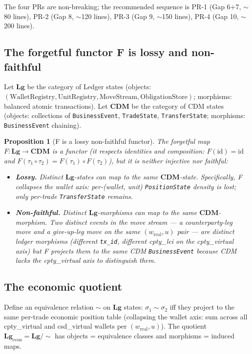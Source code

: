 \documentclass[11pt,a4paper]{article}
\newtheorem{proposition}[definition]{Proposition}
\begin{document}
The four PRs are non-breaking; the recommended sequence is PR-1 (Gap 6+7, $\sim$80 lines), PR-2 (Gap 8, $\sim$120 lines), PR-3 (Gap 9, $\sim$150 lines), PR-4 (Gap 10, $\sim$200 lines).

\subsection{The forgetful functor F is lossy and non-faithful}
\label{sec:cdm-functor}

Let $\mathbf{Lg}$ be the category of Ledger states (objects: $(\mathrm{WalletRegistry}, \mathrm{UnitRegistry}, \mathrm{MoveStream}, \mathrm{ObligationStore})$; morphisms: balanced atomic transactions). Let $\mathbf{CDM}$ be the category of CDM states (objects: collections of \texttt{BusinessEvent}, \texttt{TradeState}, \texttt{TransferState}; morphisms: \texttt{BusinessEvent} chaining).

\begin{proposition}[F is a lossy non-faithful functor]
\label{prop:functor}
The forgetful map $F : \mathbf{Lg} \to \mathbf{CDM}$ is a functor (it respects identities and composition: $F(\mathrm{id}) = \mathrm{id}$ and $F(\tau_1 \circ \tau_2) = F(\tau_1) \circ F(\tau_2)$), but it is neither injective nor faithful:
\begin{itemize}[nosep]
\item \textbf{Lossy.} Distinct $\mathbf{Lg}$-states can map to the same $\mathbf{CDM}$-state. Specifically, F collapses the wallet axis: per-(wallet, unit) \texttt{PositionState} density is lost; only per-trade \texttt{TransferState} remains.
\item \textbf{Non-faithful.} Distinct $\mathbf{Lg}$-morphisms can map to the same $\mathbf{CDM}$-morphism. Two distinct events in the move stream --- a counterparty-leg move and a give-up-leg move on the same $(w_{\mathrm{real}}, u)$ pair --- are distinct ledger morphisms (different \texttt{tx\_id}, different cpty\_lei on the cpty\_virtual axis) but F projects them to the same CDM \texttt{BusinessEvent} because CDM lacks the cpty\_virtual axis to distinguish them.
\end{itemize}
\end{proposition}

\subsection{The economic quotient}

Define an equivalence relation $\sim$ on $\mathbf{Lg}$ states: $\sigma_1 \sim \sigma_2$ iff they project to the same per-trade economic position table (collapsing the wallet axis: sum across all cpty\_virtual and csd\_virtual wallets per $(w_{\mathrm{real}}, u)$). The quotient $\mathbf{Lg}_{\mathrm{econ}} = \mathbf{Lg} / \sim$ has objects = equivalence classes and morphisms = induced maps.
\end{document}
